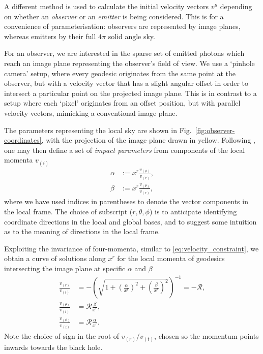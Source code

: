 \documentclass[fleqn,usenatbib]{mnras}
\begin{document}
A different method is used to calculate the initial velocity vectors $v^\mu$
depending on whether an \emph{observer} or an \emph{emitter} is being
considered. This is for a convenience of parameterisation: observers are
represented by image planes, whereas emitters by their full $4 \pi$ solid angle
sky.

For an observer, we are interested in the sparse set of emitted photons which
reach an image plane representing the observer's field of view. We use a
`pinhole camera' setup, where every geodesic originates from the same point at
the observer, but with a velocity vector that has a slight angular offset in
order to intersect a particular point on the projected image plane. This is in
contrast to a setup where each `pixel' originates from an offset position, but
with parallel velocity vectors, mimicking a conventional image plane.

The parameters representing the local sky are shown in
Fig.~\ref{fig:observer-coordinates}, with the projection of the image plane
drawn in yellow. Following \citet{cunningham_optical_1973}, one may then define
a set of \emph{impact parameters} from components of the local momenta $v_{(i)}$
\begin{align}
    \alpha &:=  x^r \frac{v_{(\phi)}}{v_{(r)}}, \\
    \beta &:= x^r \frac{v_{(\theta)}}{v_{(r)}},
\end{align}
where we have used indices in parentheses to denote the vector components in the
local frame. The choice of subscript ($r, \theta, \phi$) is to anticipate
identifying coordinate directions in the local and global bases, and to suggest
some intuition as to the meaning of directions in the local frame.

Exploiting the invariance of four-momenta, similar to
\eqref{eq:velocity_constraint}, we obtain a curve of solutions along $x^r$ for
the local momenta of geodesics intersecting the image plane at specific $\alpha$
and $\beta$
\begin{align}
    \frac{v_{(r)}}{v_{(t)}} &= -\left( \sqrt{1 +
    \left(\frac{\alpha}{x^r}\right)^2 + \left(\frac{\beta}{x^r}\right)^2}
\right)^{-1} = -\mathscr{R}, \\
    \frac{v_{(\theta)}}{v_{(t)}} &= \mathscr{R} \frac{\beta}{x^r}, \\
    \frac{v_{(\phi)}}{v_{(t)}} &= \mathscr{R} \frac{\alpha}{x^r}.
\end{align}
Note the choice of sign in the root of $v_{(r)} / v_{(t)}$, chosen so the
momentum points inwards towards the black hole.
\end{document}
